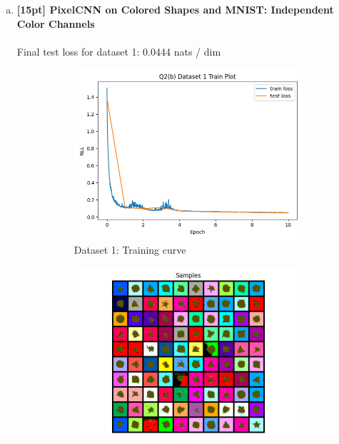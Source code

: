 \documentclass{article}
\begin{document}
\begin{enumerate}[(a)]
\newpage

\item {\bf [15pt] PixelCNN on Colored Shapes and MNIST: Independent Color Channels} \\\\
Final test loss for dataset 1: 0.0444  nats / dim
\begin{figure}[H]
    \centering
    \begin{subfigure}{0.45\textwidth}
        \centering
        \includegraphics[width=\textwidth]{figures/q2_b_dset1_train_plot.png}
        \caption{Dataset 1: Training curve}
    \end{subfigure}
    \hspace{0.2in}
    \begin{subfigure}{0.45\textwidth}
        \centering
        \includegraphics[width=\textwidth]{figures/q2_b_dset1_samples.png}

\end{subfigure}
\end{figure}
\end{enumerate}
\end{document}
